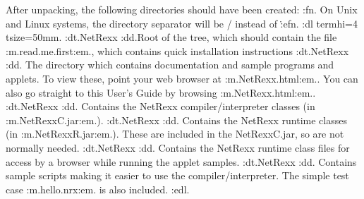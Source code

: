 After unpacking, the following directories should have been created:
:fn.
On Unix and Linux systems, the directory separator will be /
instead of \.
:efn.
:dl termhi=4 tsize=50mm.
:dt.NetRexx
:dd.Root of the tree, which should contain the
file :m.read.me.first:em., which contains quick installation
instructions
:dt.NetRexx\browse
:dd.
The directory which contains documentation and sample programs and
applets.
To view these, point your web browser at :m.NetRexx\browse\netrexx.html:em..
You can also go straight to this User's Guide by
browsing :m.NetRexx\browse\nrusers.html:em..
:dt.NetRexx\lib
{}
:dd.
Contains the NetRexx compiler/interpreter classes (in :m.NetRexxC.jar:em.).
:dt.NetRexx\runlib
:dd.
Contains the NetRexx runtime classes (in :m.NetRexxR.jar:em.).  These are
included in the NetRexxC.jar, so are not normally needed.
:dt.NetRexx\netrexx\lang
:dd.
Contains the NetRexx runtime class files for access by a browser while
running the applet samples.
:dt.NetRexx\bin
:dd.
Contains sample scripts making it easier to use the
compiler/interpreter.   The simple test case :m.hello.nrx:em. is also
included.
:edl.
